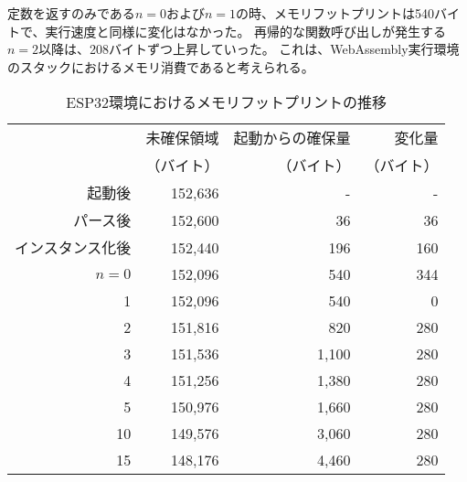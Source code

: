 定数を返すのみである$n=0$および$n=1$の時、メモリフットプリントは540バイトで、実行速度と同様に変化はなかった。
再帰的な関数呼び出しが発生する$n=2$以降は、208バイトずつ上昇していった。
これは、WebAssembly実行環境のスタックにおけるメモリ消費であると考えられる。

\begin{table}[htbp]
  \caption{ESP32環境におけるメモリフットプリントの推移}
  \label{tab:heap_size}
  \begin{center}
    \begin{tabular}{rrrr}
      \hline
      & 未確保領域 & 起動からの確保量 & 変化量 \\
      & （バイト） & （バイト） & （バイト） \\ \hline \hline
      起動後      & 152,636 & - & - \\ \hline
      パース後     & 152,600 & 36 & 36 \\ \hline
      インスタンス化後 & 152,440  & 196 & 160 \\ \hline
      $n=0$  & 152,096 &   540 & 344 \\ \hline
      1  & 152,096 &   540 &   0 \\ \hline
      2  & 151,816 &   820 & 280 \\ \hline
      3  & 151,536 & 1,100 & 280 \\ \hline
      4  & 151,256 & 1,380 & 280 \\ \hline
      5  & 150,976 & 1,660 & 280 \\ \hline
      10 & 149,576 & 3,060 & 280 \\ \hline
      15 & 148,176 & 4,460 & 280 \\ \hline

\end{tabular}
\end{center}
\end{table}
